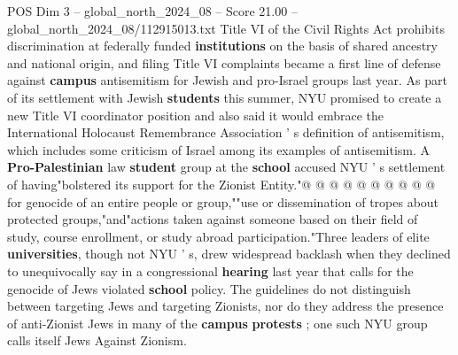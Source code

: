 \begin{textsample}{POS Dim 3 – global\_north\_2024\_08 – Score 21.00 – global\_north\_2024\_08/112915013.txt}
Title VI of the Civil Rights Act prohibits discrimination at federally funded \textbf{institutions} on the basis of shared ancestry and national origin, and filing Title VI complaints became a first line of defense against \textbf{campus} antisemitism for Jewish and pro-Israel groups last year.
As part of its settlement with Jewish \textbf{students} this summer, NYU promised to create a new Title VI coordinator position and also said it would embrace the International Holocaust Remembrance Association ' s definition of antisemitism, which includes some criticism of Israel among its examples of antisemitism.
A \textbf{Pro-Palestinian} law \textbf{student} group at the \textbf{school} accused NYU ' s settlement of having"bolstered its support for the Zionist Entity."@ @ @ @ @ @ @ @ @ @ for genocide of an entire people or group,""use or dissemination of tropes about protected groups,"and"actions taken against someone based on their field of study, course enrollment, or study abroad participation."Three leaders of elite \textbf{universities}, though not NYU ' s, drew widespread backlash when they declined to unequivocally say in a congressional \textbf{hearing} last year that calls for the genocide of Jews violated \textbf{school} policy.
The guidelines do not distinguish between targeting Jews and targeting Zionists, nor do they address the presence of anti-Zionist Jews in many of the \textbf{campus} \textbf{protests} ; one such NYU group calls itself Jews Against Zionism.

\end{textsample}
